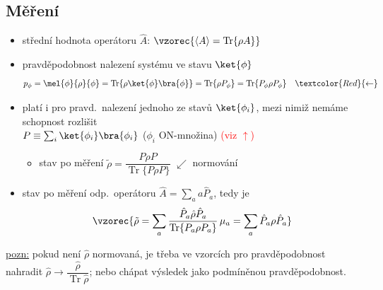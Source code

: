 \subsection*{Měření}
\begin{itemize}
  \item střední hodnota operátoru $\hat A$: \quad $\vzorec{\langle A\rangle = \operatorname{Tr}\{\rho A\}}$ \\
  \item pravděpodobnost nalezení systému ve stavu $\ket{\phi}$
  \[
    p_\phi = \mel{\phi}{\rho}{\phi} = \operatorname{Tr}\{\rho\ket{\phi}\bra{\phi}\} = \operatorname{Tr}\{\rho P_\phi\} = \operatorname{Tr}\{P_\phi\rho P_\phi\}
    \quad \textcolor{Red}{\leftarrow}
  \]
  \item platí i pro pravd.\ nalezení jednoho ze stavů $\ket{\phi_i}$, mezi nimiž nemáme schopnost rozlišit \\
        $P \equiv \sum_i\ket{\phi_i}\bra{\phi_i}$ \quad ($\phi_i$ ON-množina) \hfill \textcolor{Red}{(viz $\uparrow$)}
        \begin{itemize}[label=--]
          \item stav po měření \quad $\tilde\rho = \dfrac{P\rho P}{\operatorname{Tr}\{P\rho P\}}$ \quad $\swarrow$ normování
        \end{itemize}
  \item stav po měření odp.\ operátoru $\hat A = \sum_a a\hat P_a$, tedy je
  \[
    \vzorec{\tilde\rho = \sum_a\frac{\hat P_a\hat\rho\hat P_a}{\operatorname{Tr}\{P_a\rho P_a\}}\,\mu_a = \sum_a\hat P_a\rho\hat P_a}
  \]
\end{itemize}

\underline{pozn:} pokud není $\hat\rho$ normovaná, je třeba ve vzorcích pro pravděpodobnost nahradit $\hat\rho\to\dfrac{\hat\rho}{\operatorname{Tr}\hat\rho}$; nebo chápat výsledek jako podmíněnou pravděpodobnost.

